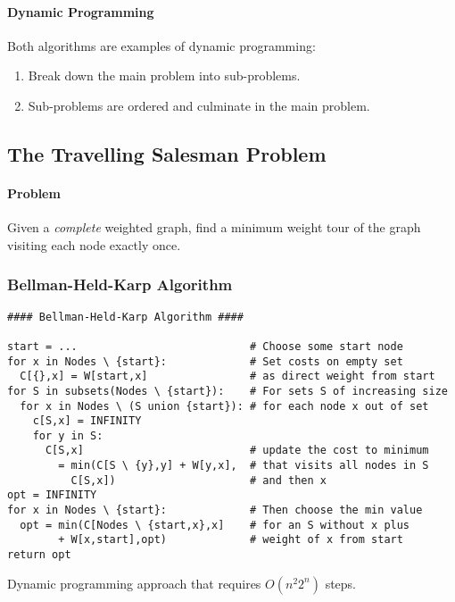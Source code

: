 \documentclass[twocolumn,english]{article}
\begin{document}
\paragraph{Dynamic Programming}

Both algorithms are examples of dynamic programming:
\begin{enumerate}
\item Break down the main problem into sub-problems.
\item Sub-problems are ordered and culminate in the main problem.
\end{enumerate}

\subsection{The Travelling Salesman Problem}


\paragraph{Problem}

Given a \emph{complete} weighted graph, find a minimum weight tour
of the graph visiting each node exactly once.


\subsubsection{Bellman-Held-Karp Algorithm}

\begin{lstlisting}[basicstyle={\footnotesize\ttfamily},showstringspaces=false]
#### Bellman-Held-Karp Algorithm ####

start = ...                           # Choose some start node
for x in Nodes \ {start}:             # Set costs on empty set
  C[{},x] = W[start,x]                # as direct weight from start
for S in subsets(Nodes \ {start}):    # For sets S of increasing size
  for x in Nodes \ (S union {start}): # for each node x out of set
    c[S,x] = INFINITY
    for y in S:
      C[S,x]                          # update the cost to minimum
        = min(C[S \ {y},y] + W[y,x],  # that visits all nodes in S
          C[S,x])                     # and then x
opt = INFINITY
for x in Nodes \ {start}:             # Then choose the min value
  opt = min(C[Nodes \ {start,x},x]    # for an S without x plus
        + W[x,start],opt)             # weight of x from start
return opt
\end{lstlisting}


Dynamic programming approach that requires $O\left(n^{2}2^{n}\right)$
steps.
\end{document}
